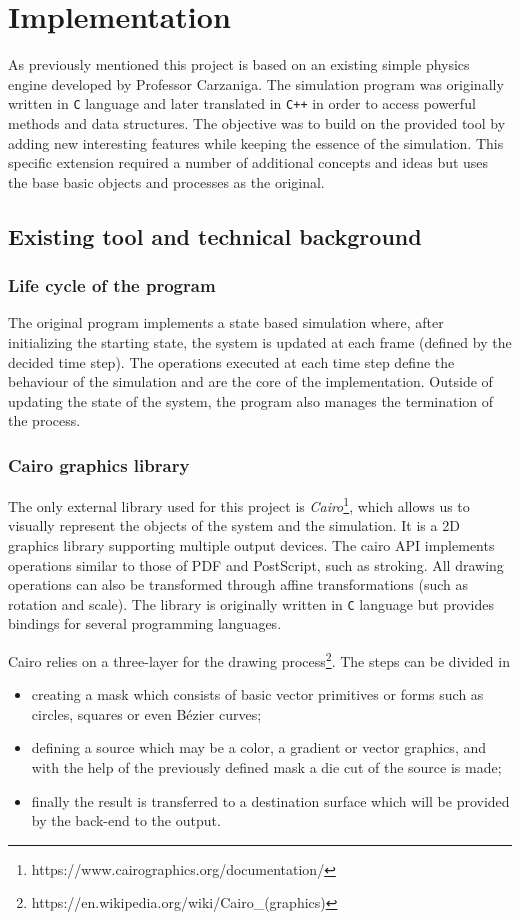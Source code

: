 \documentclass[]{usiinfbachelorproject}
\begin{document}
\newpage
\section{Implementation}
As previously mentioned this project is based on an existing simple physics engine
 developed by Professor Carzaniga. The simulation program was originally written in 
\texttt{C} language and later translated in \texttt{C++} in order to access powerful methods and 
data structures. The objective was to build on the provided tool by adding new interesting 
features while keeping the essence of the simulation. This specific extension required a number 
of additional concepts and ideas but uses the base basic objects and processes as the original.
\subsection{Existing tool and technical background}
\subsubsection{Life cycle of the program}
The original program implements a state based simulation where, after initializing the starting state, the system is 
updated at each frame (defined by the decided time step). The operations executed at each time step define the 
behaviour of the simulation and are the core of the implementation. Outside of updating the state of the system, the 
program also manages the termination of the process. 

\subsubsection{Cairo graphics library}
The only external library used for this project is \textit{Cairo}\footnote{https://www.cairographics.org/documentation/}, which allows us to visually represent the 
objects of the system and the simulation. It is a 2D graphics library supporting multiple output devices. The cairo API implements operations 
similar to those of PDF and PostScript, such as stroking. All drawing operations can also be 
transformed through affine transformations (such as rotation and scale). The library is originally written in \texttt{C} language but provides bindings for several programming languages.

Cairo relies on a three-layer for the drawing process\footnote{https://en.wikipedia.org/wiki/Cairo\_(graphics)}. The steps can be divided in
\begin{itemize}
  \item creating a mask which consists of basic vector primitives or forms such as circles, squares or even 
  Bézier curves;
  \item defining a source which may be a color, a gradient or vector graphics, and with the help of the 
  previously defined mask a die cut of the source is made;
  \item finally the result is transferred to a destination surface which will be provided by the back-end to the output.
\end{itemize}
\end{document}
